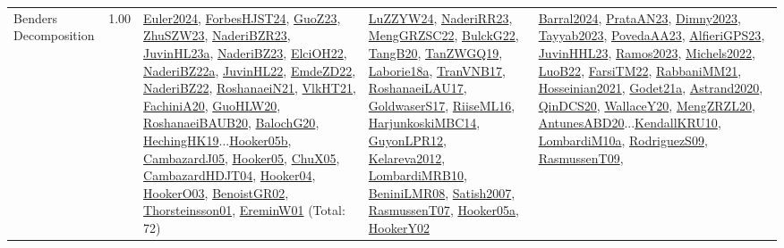 {\begin{longtable}{p{3cm}r>{\raggedright\arraybackslash}p{6cm}>{\raggedright\arraybackslash}p{6cm}>{\raggedright\arraybackslash}p{8cm}}
\index{Benders Decomposition}\index{Concepts!Benders Decomposition}Benders Decomposition &  1.00 & \hyperref[detail:Euler2024]{Euler2024}, \hyperref[detail:ForbesHJST24]{ForbesHJST24}, \hyperref[detail:GuoZ23]{GuoZ23}, \hyperref[detail:ZhuSZW23]{ZhuSZW23}, \hyperref[detail:NaderiBZR23]{NaderiBZR23}, \hyperref[detail:JuvinHL23a]{JuvinHL23a}, \hyperref[detail:NaderiBZ23]{NaderiBZ23}, \hyperref[detail:ElciOH22]{ElciOH22}, \hyperref[detail:NaderiBZ22a]{NaderiBZ22a}, \hyperref[detail:JuvinHL22]{JuvinHL22}, \hyperref[detail:EmdeZD22]{EmdeZD22}, \hyperref[detail:NaderiBZ22]{NaderiBZ22}, \hyperref[detail:RoshanaeiN21]{RoshanaeiN21}, \hyperref[detail:VlkHT21]{VlkHT21}, \hyperref[detail:FachiniA20]{FachiniA20}, \hyperref[detail:GuoHLW20]{GuoHLW20}, \hyperref[detail:RoshanaeiBAUB20]{RoshanaeiBAUB20}, \hyperref[detail:BalochG20]{BalochG20}, \hyperref[detail:HechingHK19]{HechingHK19}...\hyperref[detail:Hooker05b]{Hooker05b}, \hyperref[detail:CambazardJ05]{CambazardJ05}, \hyperref[detail:Hooker05]{Hooker05}, \hyperref[detail:ChuX05]{ChuX05}, \hyperref[detail:CambazardHDJT04]{CambazardHDJT04}, \hyperref[detail:Hooker04]{Hooker04}, \hyperref[detail:HookerO03]{HookerO03}, \hyperref[detail:BenoistGR02]{BenoistGR02}, \hyperref[detail:Thorsteinsson01]{Thorsteinsson01}, \hyperref[detail:EreminW01]{EreminW01} (Total: 72) & \hyperref[detail:LuZZYW24]{LuZZYW24}, \hyperref[detail:NaderiRR23]{NaderiRR23}, \hyperref[detail:MengGRZSC22]{MengGRZSC22}, \hyperref[detail:BulckG22]{BulckG22}, \hyperref[detail:TangB20]{TangB20}, \hyperref[detail:TanZWGQ19]{TanZWGQ19}, \hyperref[detail:Laborie18a]{Laborie18a}, \hyperref[detail:TranVNB17]{TranVNB17}, \hyperref[detail:RoshanaeiLAU17]{RoshanaeiLAU17}, \hyperref[detail:GoldwaserS17]{GoldwaserS17}, \hyperref[detail:RiiseML16]{RiiseML16}, \hyperref[detail:HarjunkoskiMBC14]{HarjunkoskiMBC14}, \hyperref[detail:GuyonLPR12]{GuyonLPR12}, \hyperref[detail:Kelareva2012]{Kelareva2012}, \hyperref[detail:LombardiMRB10]{LombardiMRB10}, \hyperref[detail:BeniniLMR08]{BeniniLMR08}, \hyperref[detail:Satish2007]{Satish2007}, \hyperref[detail:RasmussenT07]{RasmussenT07}, \hyperref[detail:Hooker05a]{Hooker05a}, \hyperref[detail:HookerY02]{HookerY02} & \hyperref[detail:Barral2024]{Barral2024}, \hyperref[detail:PrataAN23]{PrataAN23}, \hyperref[detail:Dimny2023]{Dimny2023}, \hyperref[detail:Tayyab2023]{Tayyab2023}, \hyperref[detail:PovedaAA23]{PovedaAA23}, \hyperref[detail:AlfieriGPS23]{AlfieriGPS23}, \hyperref[detail:JuvinHHL23]{JuvinHHL23}, \hyperref[detail:Ramos2023]{Ramos2023}, \hyperref[detail:Michels2022]{Michels2022}, \hyperref[detail:LuoB22]{LuoB22}, \hyperref[detail:FarsiTM22]{FarsiTM22}, \hyperref[detail:RabbaniMM21]{RabbaniMM21}, \hyperref[detail:Hosseinian2021]{Hosseinian2021}, \hyperref[detail:Godet21a]{Godet21a}, \hyperref[detail:Astrand2020]{Astrand2020}, \hyperref[detail:QinDCS20]{QinDCS20}, \hyperref[detail:WallaceY20]{WallaceY20}, \hyperref[detail:MengZRZL20]{MengZRZL20}, \hyperref[detail:AntunesABD20]{AntunesABD20}...\hyperref[detail:KendallKRU10]{KendallKRU10}, \hyperref[detail:LombardiM10a]{LombardiM10a}, \hyperref[detail:RodriguezS09]{RodriguezS09}, \hyperref[detail:RasmussenT09]{RasmussenT09}, 
\end{longtable}}
